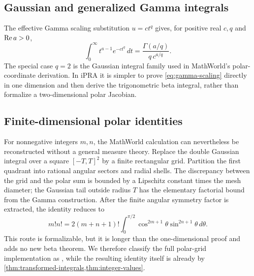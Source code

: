 \subsection{Gaussian and generalized Gamma integrals}

The effective Gamma scaling substitution $u=ct^q$ gives, for positive real $c,q$ and $\operatorname{Re} a>0$,
\begin{equation}
 \boxed{
 \int_0^\infty t^{a-1}e^{-ct^q}\,dt
 =\frac{\Gamma(a/q)}{q\,c^{a/q}}.}
 \label{eq:gamma-scaling}
\end{equation}
The special case $q=2$ is the Gaussian integral family used in MathWorld's polar-coordinate derivation.  In iPRA it is simpler to prove \eqref{eq:gamma-scaling} directly in one dimension and then derive the trigonometric beta integral, rather than formalize a two-dimensional polar Jacobian.

\subsection{Finite-dimensional polar identities}

For nonnegative integers $m,n$, the MathWorld calculation can nevertheless be reconstructed without a general measure theory.  Replace the double Gaussian integral over a square $[-T,T]^2$ by a finite rectangular grid.  Partition the first quadrant into rational angular sectors and radial shells.  The discrepancy between the grid and the polar sum is bounded by a Lipschitz constant times the mesh diameter; the Gaussian tail outside radius $T$ has the elementary factorial bound from the Gamma construction.  After the finite angular symmetry factor is extracted, the identity reduces to
\[
 m!n!
 =2(m+n+1)!
 \int_0^{\pi/2}\cos^{2m+1}\theta\sin^{2n+1}\theta\,d\theta.
\]
This route is formalizable, but it is longer than the one-dimensional proof and adds no new beta theorem.  We therefore classify the full polar-grid implementation as \statusC{}, while the resulting identity itself is already \statusA{} by \cref{thm:transformed-integrals,thm:integer-values}.
